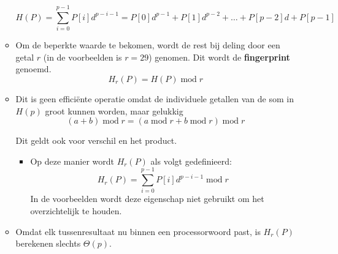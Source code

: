 \begin{itemize}
\begin{itemize}
        $$H(P) = \sum_{i=0}^{p-1} P[i]d^{p-i-1} = P[0]d^{p-1} + P[1]d^{p-2} + \dots + P[p-2]d + P[p-1]$$

        \item Om de beperkte waarde te bekomen, wordt de rest bij deling door een getal $r$ (in de voorbeelden is $r = 29$) genomen. Dit wordt de \textbf{fingerprint} genoemd.
        $$H_r(P) = H(P)\;\mathrm{mod}\;r$$
    
        \item Dit is geen efficiënte operatie omdat de individuele getallen van de som in $H(p)$ groot kunnen worden, maar gelukkig
        $$(a + b) \;\mathrm{mod}\;r = (a\;\mathrm{mod}\;r + b\;\mathrm{mod}\;r)\;\mathrm{mod}\;r$$
    
        Dit geldt ook voor verschil en het product.
        \begin{itemize}
            \item Op deze manier wordt $H_r(P)$ als volgt gedefinieerd:
            $$H_r(P) = \sum_{i=0}^{p-1} P[i]d^{p-i-1}\;\mathrm{mod}\;r$$
            \alert In de voorbeelden wordt deze eigenschap niet gebruikt om het overzichtelijk te houden.
        \end{itemize}
    
        \item Omdat elk tussenresultaat nu binnen een processorwoord past, is $H_r(P)$ berekenen slechts $\Theta(p)$.


\end{itemize}
\end{itemize}
